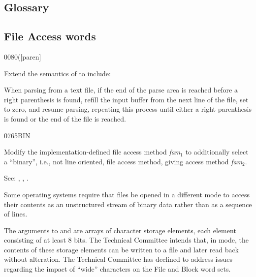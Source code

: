 \begin{info}
\subsection{Glossary}
\end{info}

\subsection{File Access words} %

\begin{newword}[p]{0080}{(}[paren]

	Extend the semantics of  to include:

	When parsing from a text file, if the end of the parse area is
	reached before a right parenthesis is found, refill the input
	buffer from the next line of the file, set  to
	zero, and resume parsing, repeating this process until either a
	right parenthesis is found or the end of the file is reached.
\end{newword}


\begin{newword}{0765}{BIN}

	Modify the implementation-defined file access method
	\emph{fam}$_1$ to additionally select a ``binary'', i.e., not
	line oriented, file access method, giving access method
	\emph{fam}$_2$.

\item[See:]
	,
	,
	.

	\begin{rationale} %
		Some operating systems require that files be opened in a
		different mode to access their contents as an unstructured
		stream of binary data rather than as a sequence of lines.

		The arguments to  and  are
		arrays of character storage elements, each element consisting
		of at least 8 bits. The Technical Committee intends that, in
		 mode, the contents of these storage elements can be
		written to a file and later read back without alteration. The
		Technical Committee has declined to address issues regarding
		the impact of ``wide'' characters on the File and Block word
		sets.
	\end{rationale}
\end{newword}


